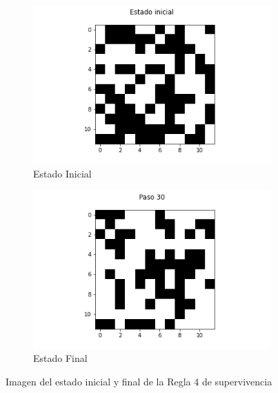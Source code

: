 \documentclass{article}
\begin{document}
\begin{figure}[H]
\centering
\begin{subfigure}[b]{0.45\linewidth}
\includegraphics[width=\linewidth]{p2_r4_t00_p.png}
\caption{Estado Inicial}
\end{subfigure}
\begin{subfigure}[b]{0.45\linewidth}
\includegraphics[width=\linewidth]{p2_r4_t30_p.png}
\caption{Estado Final}
\end{subfigure}
\caption{Imagen del estado inicial y final de la Regla 4 de supervivencia}
\label{fig:westminster}
\end{figure}
\end{document}
